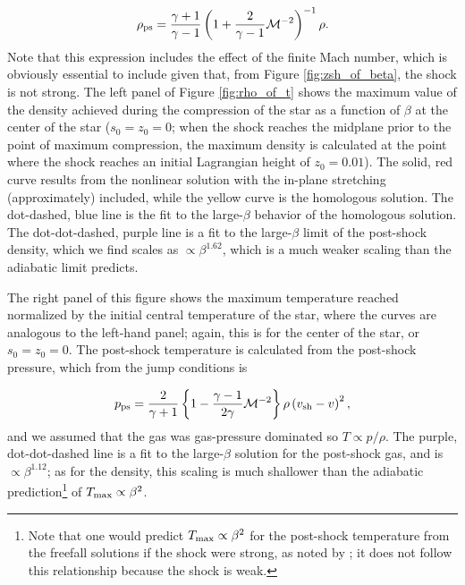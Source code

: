 \documentclass[twocolumn]{aastex62}
\begin{document}
\begin{equation}
\rho_{\rm ps} = \frac{\gamma+1}{\gamma-1}\left(1 +\frac{2}{\gamma-1}
\mathcal{M}^{-2}\right)^{-1}\rho. \label{rhosh}
\end{equation}
Note that this expression includes the effect of the finite Mach number, which is obviously essential to include given that, from Figure \ref{fig:zsh_of_beta}, the shock is not strong. The left panel of Figure \ref{fig:rho_of_t} shows the maximum value of the density achieved during the compression of the star as a function of $\beta$ at the center of the star ($s_0 = z_0 = 0$; when the shock reaches the midplane prior to the point of maximum compression, the maximum density is calculated at the point where the shock reaches an initial Lagrangian height of $z_0 = 0.01$). The solid, red curve results from the nonlinear solution with the in-plane stretching (approximately) included, while the yellow curve is the homologous solution. The dot-dashed, blue line is the fit to the large-$\beta$ behavior of the homologous solution. The dot-dot-dashed, purple line is a fit to the large-$\beta$ limit of the post-shock density, which we find scales as $\propto \beta^{1.62}$, which is a much weaker scaling than the adiabatic limit predicts. 

The right panel of this figure shows the maximum temperature reached normalized by the initial central temperature of the star, where the curves are analogous to the left-hand panel; again, this is for the center of the star, or $s_0 = z_0 = 0$. The post-shock temperature is calculated from the post-shock pressure, which from the jump conditions is

\begin{equation}
p_{\rm ps} = \frac{2}{\gamma+1}\left\{1-\frac{\gamma-1}{2\gamma}\mathcal{M}^{-2}\right\}\rho\left(v_{\rm sh}-v\right)^2, \label{psh}
\end{equation}
and we assumed that the gas was gas-pressure dominated so $T \propto p/\rho$. The purple, dot-dot-dashed line is a fit to the large-$\beta$ solution for the post-shock gas, and is $\propto \beta^{1.12}$; as for the density, this scaling is much shallower than the adiabatic prediction\footnote{Note that one would predict $T_{\rm max} \propto \beta^2$ for the post-shock temperature from the freefall solutions if the shock were strong, as noted by \cite{Bicknell:1983aa}; it does not follow this relationship because the shock is weak.} of $T_{\rm max} \propto \beta^2$. 
\end{document}
